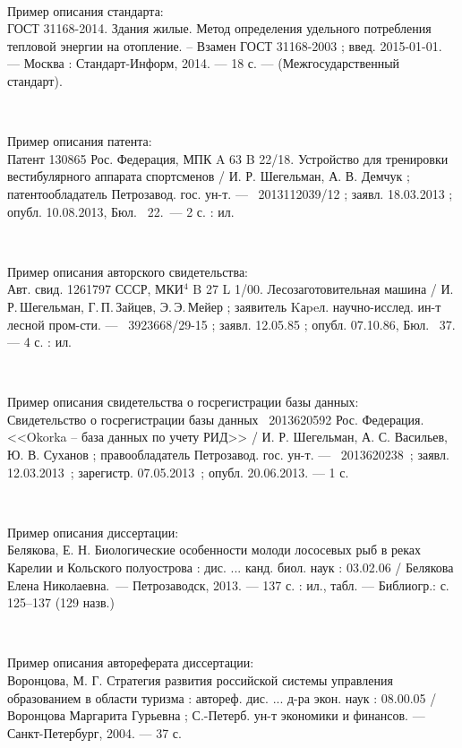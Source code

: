 \documentclass[utf8,12pt, coursreport]{G7-32}
\begin{document}
~

Пример описания стандарта:\\
ГОСТ 31168-2014. Здания жилые. Метод определения удельного потребления тепловой энергии на отопление. -- Взамен ГОСТ 31168-2003 ; введ. 2015-01-01. --- Москва : Стандарт-Информ, 2014. --- 18 с. --- (Межгосударственный стандарт).

~

Пример описания патента:\\
Патент 130865 Рос. Федерация, МПК A 63 B 22/18. Устройство для тренировки вестибулярного аппарата спортсменов / И. Р. Шегельман, А. В. Демчук ; патентообладатель Петрозавод. гос. ун-т. --- \No~2013112039/12 ; заявл. 18.03.2013 ; опубл. 10.08.2013, Бюл. \No~22.~--- 2 с. : ил. 

~

Пример описания авторского свидетельства:\\
Авт. свид. 1261797 СССР, МКИ$^4$ B 27 L 1/00. Лесозаготовительная машина / И.\,Р.\,Шегель\-ман, Г.\,П.\,Зайцев, Э.\,Э.\,Мейер ; заявитель Kаpeл. научно-исслед. ин-т 
лесной пром-сти. --- \No~3923668/29-15 ; заявл. 12.05.85 ; опубл. 07.10.86, Бюл. \No~37. --- 4 с. : ил. 

~

Пример описания свидетельства о госрегистрации базы данных:\\
Свидетельство о госрегистрации базы данных \No~2013620592 Рос. Федерация.
<<Okorka -- база данных по учету РИД>> / И. Р. Шегельман, А. С. Васильев, Ю. В. Суханов ; правообладатель Петрозавод. гос. ун-т. --- \No~2013620238~; заявл. 12.03.2013~; зарегистр. 07.05.2013~; опубл. 20.06.2013. --- 1 с. 

~

Пример описания диссертации:\\
Белякова, Е. Н. Биологические особенности молоди лососевых рыб в реках Карелии и Кольского полуострова : дис. ... канд. биол. наук : 03.02.06 / Белякова Елена Николаевна.~--- Петрозаводск, 2013. --- 137 с. : ил., табл. --- Библиогр.: с. 125--137 (129 назв.)

~

Пример описания автореферата диссертации:\\
Воронцова, М. Г. Стратегия развития российской системы управления образованием в области туризма : автореф. дис. ... д-ра экон. наук : 08.00.05 / Воронцова Маргарита Гурьевна ; С.-Петерб. ун-т экономики и финансов. --- Санкт-Петербург, 2004. --- 37 с.

~
\end{document}
